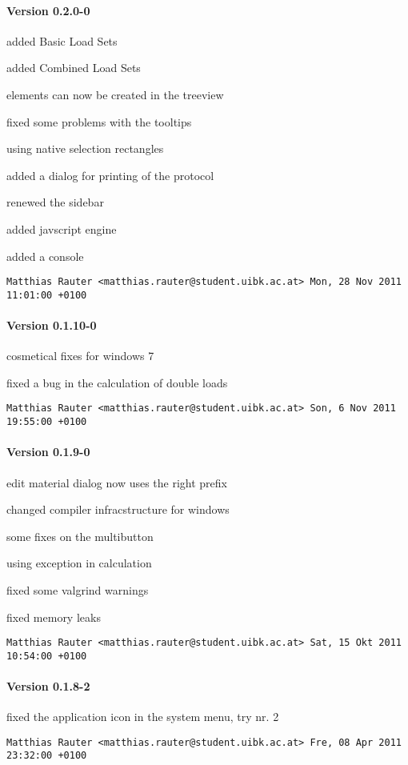 \paragraph{Version 0.2.0-0}
\begin{compactitem}
\item added Basic Load Sets
\item added Combined Load Sets
\item elements can now be created in the treeview
\item fixed some problems with the tooltips
\item using native selection rectangles
\item added a dialog for printing of the protocol
\item renewed the sidebar
\item added javscript engine
\item added a console
\end{compactitem}
\texttt{Matthias Rauter <matthias.rauter@student.uibk.ac.at>  Mon, 28 Nov 2011 11:01:00 +0100}
\paragraph{Version 0.1.10-0}
\begin{compactitem}
\item cosmetical fixes for windows 7
\item fixed a bug in the calculation of double loads
\end{compactitem}
\texttt{Matthias Rauter <matthias.rauter@student.uibk.ac.at>  Son, 6 Nov 2011 19:55:00 +0100}
\paragraph{Version 0.1.9-0}
\begin{compactitem}
\item edit material dialog now uses the right prefix
\item changed compiler infracstructure for windows
\item some fixes on the multibutton
\item using exception in calculation
\item fixed some valgrind warnings 
\item fixed memory leaks
\end{compactitem}
\texttt{Matthias Rauter <matthias.rauter@student.uibk.ac.at>  Sat, 15 Okt 2011 10:54:00 +0100}
\paragraph{Version 0.1.8-2}
\begin{compactitem}
\item fixed the application icon in the system menu, try nr. 2
\end{compactitem}
\texttt{Matthias Rauter <matthias.rauter@student.uibk.ac.at>  Fre, 08 Apr 2011 23:32:00 +0100}
